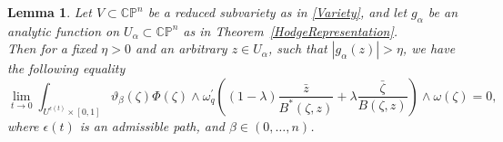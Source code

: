 \documentclass[11pt,reqno]{amsart}
\numberwithin{equation}{section}
\newtheorem{lemma}[proposition]{Lemma}
\begin{document}
\begin{lemma}\label{BochnerZero} Let $V\subset {{\mathbb C}}{{\mathbb P}}^n$ be a reduced subvariety
as in \eqref{Variety}, and let $g_{\alpha}$ be an analytic function on
$U_{\alpha}\subset {{\mathbb C}}{{\mathbb P}}^n$ as in Theorem~\ref{HodgeRepresentation}.\\
\indent
Then for a fixed $\eta>0$ and an arbitrary $z\in U_{\alpha}$,
such that $|g_{\alpha}(z)|>\eta$, we have the following equality
\begin{equation}\label{ZeroBochner}
\lim_{t\to 0}\int_{U^{\epsilon(t)}\times[0,1]}
\vartheta_{\beta}(\zeta)\Phi(\zeta)
\wedge\omega^{\prime}_{q}\left((1-\lambda)\frac{\bar z}{B^*(\zeta,z)}
+\lambda\frac{\bar\zeta}{B(\zeta,z)}\right)\wedge\omega(\zeta)=0,
\end{equation}
where $\epsilon(t)$ is an admissible path, and $\beta\in (0,\dots,n)$.
\end{lemma}
\end{document}
